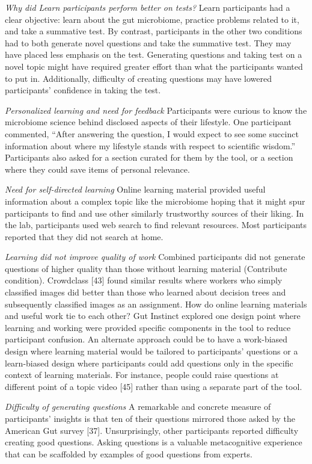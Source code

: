 \textit{Why did Learn participants perform better on tests?}
Learn participants had a clear objective: learn about the gut microbiome, practice problems related to it, and take a summative test. By contrast, participants in the other two conditions had to both generate novel questions and take the summative test. They may have placed less emphasis on the test. Generating questions and taking test on a novel topic might have required greater effort than what the participants wanted to put in. Additionally, difficulty of creating questions may have lowered participants’ confidence in taking the test. 

\textit{Personalized learning and need for feedback}
Participants were curious to know the microbiome science behind disclosed aspects of their lifestyle. One participant commented, “After answering the question, I would expect to see some succinct information about where my lifestyle stands with respect to scientific wisdom.” Participants also asked for a section curated for them by the tool, or a section where they could save items of personal relevance.
 
\textit{Need for self-directed learning}
Online learning material provided useful information about a complex topic like the microbiome hoping that it might spur participants to find and use other similarly trustworthy sources of their liking. In the lab, participants used web search to find relevant resources. Most participants reported that they did not search at home. 

\textit{Learning did not improve quality of work}
Combined participants did not generate questions of higher quality than those without learning material (Contribute condition). Crowdclass [43] found similar results where workers who simply classified images did better than those who learned about decision trees and subsequently classified images as an assignment. How do online learning materials and useful work tie to each other? Gut Instinct explored one design point where learning and working were provided specific components in the tool to reduce participant confusion. An alternate approach could be to have a work-biased design where learning material would be tailored to participants’ questions or a learn-biased design where participants could add questions only in the specific context of learning materials. For instance, people could raise questions at different point of a topic video [45] rather than using a separate part of the tool.
 
\textit{Difficulty of generating questions}
A remarkable and concrete measure of participants’ insights is that ten of their questions mirrored those asked by the American Gut survey [37]. Unsurprisingly, other participants reported difficulty creating good questions. Asking questions is a valuable metacognitive experience that can be scaffolded by examples of good questions from experts. 

